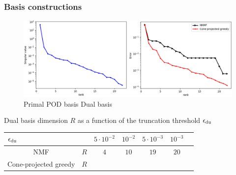 \begin{frame}\frametitle{Basis constructions}
	
	
	\hspace{-1.1cm}
	\begin{minipage}{\textwidth}
		\begin{figure}
			\includegraphics[width=1.18\textwidth]{./images/contact/sgv_nmf.png}
			\centering
			\tiny{Primal POD basis \hspace{5cm} Dual basis
			}
			\centering
		\end{figure}
	\end{minipage}
	
	\bigskip 
	
	Dual basis dimension $R$ as a function of the truncation threshold $\epsilon_{\rm du}$
	\vspace{-.1cm}
	\begin{table}[htb]
		\centering
		\begin{tabular}{|c|c||c|c|c|c|c|}
			\hline
			\multicolumn{2}{|l||}{\qquad\qquad\quad$\epsilon_{\rm du}$} &$5\cdot10^{-2}$ & $10^{-2}$ & $5\cdot10^{-3}$ &$10^{-3}$\\ \hline
			{NMF}&$R$ &
			$4$ & $10$ & $19$ & $20$\\ \hline
			{Cone-projected greedy}&$R$ &
			\bl{$2$}& \bl{$5$} & \bl{$6$} & \bl{$13$}\\ \hline
		\end{tabular}
		\label{tab:nmf}
	\end{table}
\end{frame}

